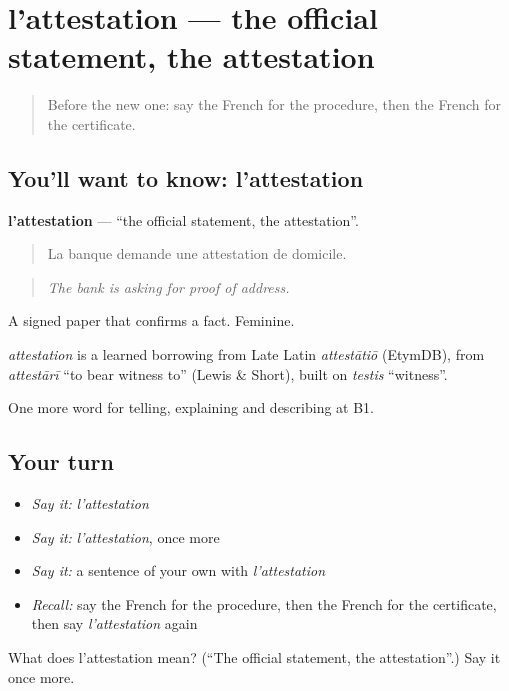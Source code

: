 \section[l'attestation]{l'attestation — the official statement, the attestation}

\label{lesson:FR-C385-attestation}



\begin{quote}
Before the new one: say the French for the procedure, then the French for the certificate.
\end{quote}

\subsection*{You'll want to know: l'attestation}
\textbf{l'attestation} — \textquotedblleft{}the official statement, the attestation\textquotedblright{}.

\begin{quote}
La banque demande une attestation de domicile.
\end{quote}

\begin{quote}
\emph{The bank is asking for proof of address.}
\end{quote}

A signed paper that confirms a fact. Feminine.

\begin{cousinweb}
\emph{attestation} is a learned borrowing from Late Latin \emph{attestātiō} (EtymDB), from \emph{attestārī} \textquotedblleft{}to bear witness to\textquotedblright{} (Lewis \& Short), built on \emph{testis} \textquotedblleft{}witness\textquotedblright{}.
\end{cousinweb}

\begin{grammarlens}[title={What you've built}]
One more word for telling, explaining and describing at B1.
\end{grammarlens}

\subsection*{Your turn}
\begin{itemize}
\raggedright
  \item \emph{Say it:} \emph{l'attestation}
  \item \emph{Say it:} \emph{l'attestation}, once more
  \item \emph{Say it:} a sentence of your own with \emph{l'attestation}
  \item \emph{Recall:} say the French for the procedure, then the French for the certificate, then say \emph{l'attestation} again
\end{itemize}

\begin{tcolorbox}[breakable,colback=teal!4,colframe=teal!35!black,title={Before you move on}]
What does l'attestation mean? (\textquotedblleft{}The official statement, the attestation\textquotedblright{}.) Say it once more.
\end{tcolorbox}
